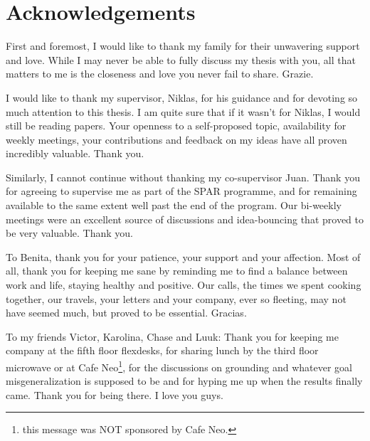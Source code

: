 \documentclass[../main.tex]{subfiles}
\begin{document}
\chapter*{Acknowledgements}

First and foremost, I would like to thank my family for their unwavering support and love. While I may
never be able to fully discuss my thesis with you, all that matters to me is the
closeness and love you never fail to share. Grazie.

I would like to thank my supervisor, Niklas, for his guidance and for devoting so much attention to
this thesis. I am quite sure that if it wasn't for Niklas, I would still be reading papers. Your
openness to a self-proposed topic, availability for weekly meetings, your contributions and feedback
on my ideas have all proven incredibly valuable. Thank you.

Similarly, I cannot continue without thanking my co-supervisor Juan. Thank you for agreeing to
supervise me as part of the SPAR programme, and for remaining available to the same extent well past
the end of the program. Our bi-weekly meetings were an excellent source of discussions and
idea-bouncing that proved to be very valuable. Thank you.

To Benita, thank you for your patience, your support and your affection. Most of all, thank you for
keeping me sane by reminding me to find a balance between work and life, staying healthy and
positive. Our calls, the times we spent cooking together, our travels, your letters and your company,
ever so fleeting, may not have seemed much, but proved to be essential. Gracias.

To my friends Victor, Karolina, Chase and Luuk: Thank you for keeping me company at the fifth floor
flexdesks, for sharing lunch by the third floor microwave or at Cafe Neo\footnote{this message was
	NOT sponsored by Cafe Neo.}, for the discussions on grounding and whatever goal misgeneralization is
supposed to be and for hyping me up when the results finally came. Thank you for being there. I love
you guys.

\thispagestyle{empty}%
\end{document}
